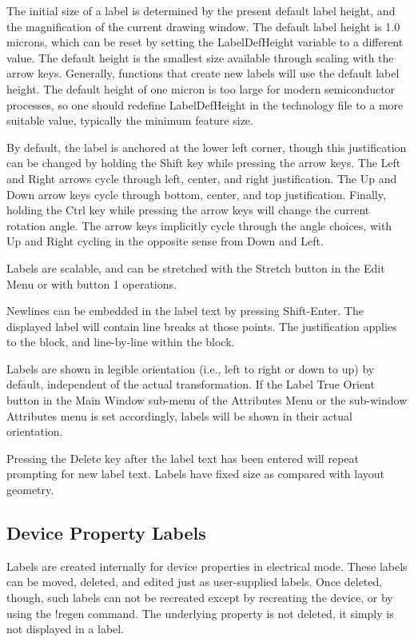 The initial size of a label is determined by the present default label
height, and the magnification of the current drawing window.  The
default label height is 1.0 microns, which can be reset by setting the
{\et LabelDefHeight} variable to a different value.  The default
height is the smallest size available through scaling with the arrow
keys.  Generally, {\Xic} functions that create new labels will use the
default label height.  The default height of one micron is too large
for modern semiconductor processes, so one should redefine {\et
LabelDefHeight} in the technology file to a more suitable value,
typically the minimum feature size.

By default, the label is anchored at the lower left corner, though
this justification can be changed by holding the {\kb Shift} key while
pressing the arrow keys.  The {\kb Left} and {\kb Right} arrows cycle
through left, center, and right justification.  The {\kb Up} and {\kb
Down} arrow keys cycle through bottom, center, and top justification. 
Finally, holding the {\kb Ctrl} key while pressing the arrow keys will
change the current rotation angle.  The arrow keys implicitly cycle
through the angle choices, with {\kb Up} and {\kb Right} cycling in
the opposite sense from {\kb Down} and {\kb Left}.

Labels are scalable, and can be stretched with the {\cb Stretch}
button in the {\cb Edit Menu} or with button 1 operations.

Newlines can be embedded in the label text by pressing {\kb
Shift-Enter}.  The displayed label will contain line breaks at those
points.  The justification applies to the block, and line-by-line
within the block.

Labels are shown in legible orientation (i.e., left to right or down
to up) by default, independent of the actual transformation.  If the
{\cb Label True Orient} button in the {\cb Main Window} sub-menu of
the {\cb Attributes Menu} or the sub-window {\cb Attributes} menu
is set accordingly, labels will be shown in their actual orientation.

Pressing the {\kb Delete} key after the label text has been entered
will repeat prompting for new label text.  Labels have fixed size as
compared with layout geometry.

\subsection{Device Property Labels}

Labels are created internally for device properties in electrical
mode.  These labels can be moved, deleted, and edited just as
user-supplied labels.  Once deleted, though, such labels can not be
recreated except by recreating the device, or by using the {\cb
!regen} command.  The underlying property is not deleted, it simply
is not displayed in a label.

